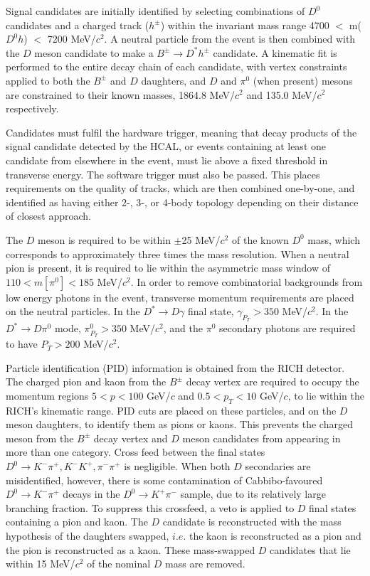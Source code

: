 \documentclass[oneside,12pt]{article}
\begin{document}
Signal candidates are initially identified by selecting combinations of $D^0$
candidates and a charged track ($h^{\pm}$) within the invariant mass range 4700
$<$ m($D^0h$) $<$ 7200 MeV/$c^2$. A neutral particle from the event is then
combined with the $D$ meson candidate to make a $B^{\pm}\rightarrow D^*h^{\pm}$
candidate. A kinematic fit is performed to the entire decay chain of each
candidate, with vertex constraints applied to both the $B^{\pm}$ and $D$
daughters, and $D$ and $\pi^0$ (when present) mesons are constrained to their
known masses, 1864.8 MeV/$c^2$ and 135.0 MeV/$c^2$ respectively.

Candidates must fulfil the hardware trigger, meaning that decay products of the
signal candidate detected by the HCAL, or events containing at least one
candidate from elsewhere in the event, must lie above a fixed threshold in
transverse energy.  The software trigger must also be passed. This places
requirements on the quality of tracks, which are then combined one-by-one, and
identified as having either 2-, 3-, or 4-body topology depending on their
distance of closest approach. 

The $D$ meson is required to be within $\pm$25 MeV/$c^2$ of the known $D^0$
mass, which corresponds to approximately three times the mass resolution.  When
a neutral pion is present, it is required to lie within the asymmetric mass
window of $110 < m[\pi^0] < 185$ MeV/$c^2$. In order to remove combinatorial
backgrounds from low energy photons in the event, transverse momentum
requirements are placed on the neutral particles. In the $D^*\rightarrow
D\gamma$ final state, $\gamma_{P_T}>350$ MeV/$c^2$. In the $D^*\rightarrow
D\pi^0$ mode, $\pi^0_{P_T}>350$ MeV/$c^2$, and the $\pi^0$ secondary photons are
required to have $P_T>200$ MeV/$c^2$.

Particle identification (PID) information is obtained from the RICH detector.
The charged pion and kaon from the $B^{\pm}$ decay vertex are required to occupy
the momentum regions $5 < p < 100$ GeV/$c$ and $0.5 < p_T < 10$ GeV/$c$, to lie
within the RICH's kinematic range. PID cuts are placed on these particles, and
on the $D$ meson daughters, to identify them as pions or kaons. This prevents
the charged meson from the $B^{\pm}$ decay vertex and $D$ meson candidates from
appearing in more than one category. Cross feed between the final states
$D^{0}\rightarrow K^-\pi^+, K^-K^+, \pi^-\pi^+$ is negligible. When both $D$
secondaries are misidentified, however, there is some contamination of
Cabbibo-favoured $D^0\rightarrow K^-\pi^+$ decays in the $D^0\rightarrow
K^+\pi^-$ sample, due to its relatively large branching fraction. To suppress
this crossfeed, a veto is applied to $D$ final states containing a pion and
kaon.  The $D$ candidate is reconstructed with the mass hypothesis of the
daughters swapped, $i.e.$ the kaon is reconstructed as a pion and the pion is
reconstructed as a kaon. These mass-swapped $D$ candidates that lie within 15
MeV/$c^2$ of the nominal $D$ mass are removed. 
\end{document}
